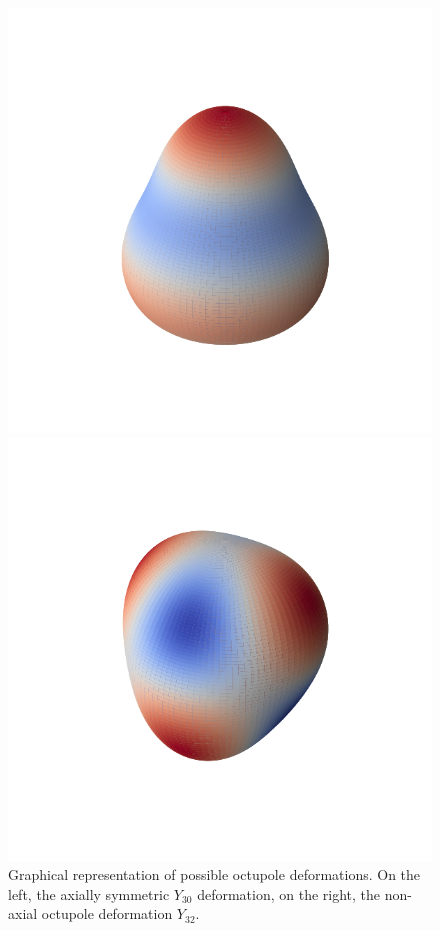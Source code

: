 \begin{figure}[H]
    \centering
\begin{minipage}{0.48\textwidth}
    \centering
    \includegraphics[width=\textwidth]{Images/octupole_Y30}
  \end{minipage}
  \hfill
  \begin{minipage}{0.48\textwidth}
    \centering
    \includegraphics[width=\textwidth]{Images/octupole_Y32}
  \end{minipage}
    \caption{Graphical representation of possible octupole deformations. On the left, the axially symmetric $Y_{30}$ deformation, on the right, the non-axial octupole deformation $Y_{32}$.}
    \label{fig:octupole_defs}
\end{figure}





